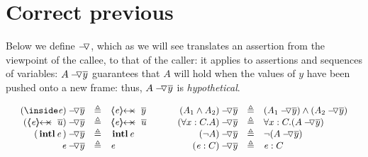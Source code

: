 \newcommand{\extract}[1]{\ensuremath{{\mathcal I}\!nvs(#1)}}
\newcommand{\specs}[1]{\ensuremath{Specs(#1)}}%

\section{Correct previous}
Below we define 
$\pushSymbolAA$, which as we will see translates an assertion from the viewpoint of the callee, to that of the caller:
it applies to assertions and sequences of variables:  $\PushAS y A$   guarantees that $A$ will hold when the values of $y$ have been pushed onto a new frame:
 thus, $\PushAS y A$ is \emph{hypothetical}.



\begin{definition}
$
\begin{array}{c}
\begin{array}{l}
\begin{array}{rclcrcl}
  \PushAS y {(\inside \re)} & \triangleq &  \protectedFrom \re {\overline {y} }
  & \ \ \  \ &
  \PushAS y   {(A_1  \wedge  A_2)} & \triangleq &  (\PushAS y  { A_1})  \wedge  ( \PushAS y  {A_2} )  
\\ 
 \PushAS y {(\protectedFrom \re {\overline {u}})} &  \triangleq& \protectedFrom \re {\overline {u}} 
  & &
 \PushAS y  {(\forall x:C.A)} & \triangleq & \forall x:C.({\PushAS y A} )  
  \\  
  \PushAS y  {(\internal \re)} &  \triangleq & {\internal \re}  %
  & & 
  \PushAS y  {(\neg A)} &  \triangleq & \neg( {\PushAS y A} )  
    \\
     \PushAS y  {\re} &  \triangleq&   \re %
    & &
    \PushAS y  {(\re:C)} &  \triangleq&   \re:C 
 \end{array}
\end{array}
\end{array}
$
\label{f:Push}
\end{definition}

